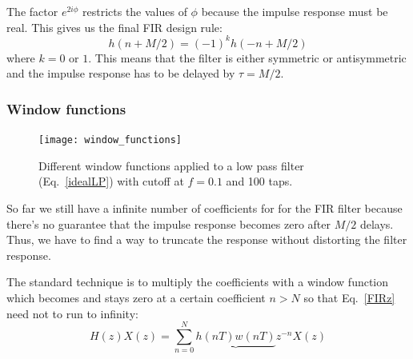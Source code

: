 \documentclass[12pt,a4paper]{article}
\begin{document}
The factor $e^{2i\phi}$ restricts the values of $\phi$ because the impulse
response must be real. This gives us the final FIR design rule:
\begin{equation}
h(n+M/2)=(-1)^k h(-n+M/2)
\end{equation}
where $k=0$ or $1$. This means that the filter is either symmetric or
antisymmetric and the impulse response has to be delayed by $\tau=M/2$.




\subsubsection{Window functions}
\begin{figure}[!hbt]
\begin{center}
\mbox{\texttt{[image: window\_functions]}}
\caption{Different window functions applied to a low pass filter 
(Eq.~\ref{idealLP}) 
with cutoff at $f=0.1$ and 100 taps. \label{window_functions}}
\end{center}
\end{figure}
So far we still have a infinite number of coefficients for 
for the FIR filter because there's no guarantee that the 
impulse response becomes zero
after $M/2$ delays. Thus, we have to find a way to truncate the
response without distorting the filter response.

The standard technique is to multiply the coefficients with a window
function which becomes and stays zero at a certain coefficient
$n>N$ so that Eq.~\ref{FIRz} need not to run to infinity:
\begin{equation}
\label{FIRzlimit}
H(z)X(z)=\sum_{n=0}^N \underbrace{h(nT) w(nT)} z^{-n} X(z)
\end{equation}
\end{document}
